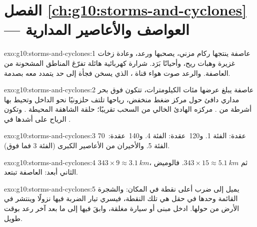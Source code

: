\section*{الفصل \ref{ch:g10:storms-and-cyclones} --- العواصف والأعاصير المدارية}

\begin{solution}{exo:g10:storms-and-cyclones:1}
 عاصفة ينتجها ركام مزني، يصحبها  ورعد، وعادة زخات غزيرة وهبات
ريح، وأحيانًا بَرَد.  شرارة كهربائية هائلة تفرّغ المناطق المشحونة من
العاصفة. والرعد صوت هواء قناة ، الذي يسخن فجأة إلى حد يتمدد معه
بصدمة.
\end{solution}

\begin{solution}{exo:g10:storms-and-cyclones:2}
 عاصفة يبلغ عرضها مئات الكيلومترات، تتكون فوق بحر مداري دافئ حول
مركز ضغط منخفض، رياحها تلتف حلزونيًا نحو الداخل وتحيط بها أشرطة من .  مركزه الهادئ الخالي من السحب تقريبًا؛  حلقة  الشاهقة المحيطة . وتكون الرياح على أشدها في .
\end{solution}

\begin{solution}{exo:g10:storms-and-cyclones:3}
\num{70}~عقدة: الفئة 1. و\num{120}~عقدة: الفئة 4.
و\num{140}~عقدة: الفئة 5. والأخيران من الأعاصير الكبرى (الفئة 3
فما فوق).
\end{solution}

\begin{solution}{exo:g10:storms-and-cyclones:4}
$343 \times 9 \approx \qty{3.1}{km}$، ثم $343 \times 15 \approx
\qty{5.1}{km}$. فالوميض الثاني أبعد: العاصفة تبتعد.
\end{solution}

\begin{solution}{exo:g10:storms-and-cyclones:5}
يميل  إلى ضرب أعلى نقطة في المكان: والشجرة القائمة وحدها في حقل هي تلك
النقطة، فيسري تيار الضربة فيها نزولًا وينتشر في الأرض من حولها. ادخل مبنى أو
سيارة مغلقة، وابقَ فيها إلى ما بعد آخر رعد بوقت طويل.
\end{solution}

